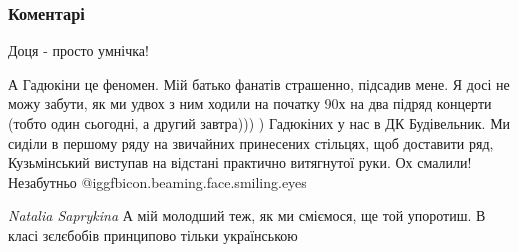  
 
 
 
 
\subsubsection{Коментарі}

\begin{itemize} %

Доця - просто умнічка!

А Гадюкіни це феномен. Мій батько фанатів страшенно, підсадив мене. Я досі не
можу забути, як ми удвох з ним ходили на початку 90х на два підряд концерти
(тобто один сьогодні, а другий завтра))) ) Гадюкіних у нас в ДК Будівельник. Ми
сиділи в першому ряду на звичайних принесених стільцях, щоб доставити ряд,
Кузьмінський виступав на відстані практично витягнутої руки. Ох смалили!
Незабутньо  @igg{fbicon.beaming.face.smiling.eyes} 

\begin{itemize} %
\emph{Natalia Saprykina}
А мій молодший теж, як ми сміємося, ще той упоротиш. В класі зєлєбобів принципово тільки українською
\end{itemize} %

\end{itemize} %

